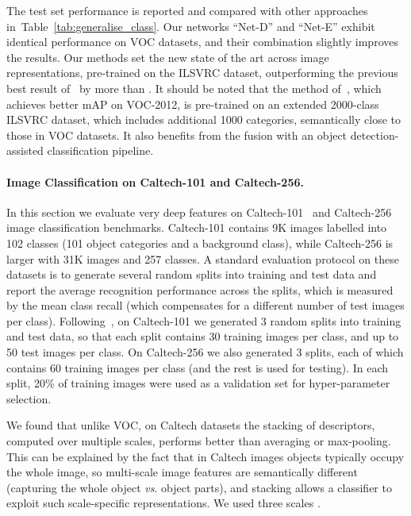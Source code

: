 \documentclass{article} \usepackage{iclr2015,times}
\makeatletter
\newcommand{\tblref}[1]{Table~\ref{#1}}
\newcommand*{\vs}{\emph{vs}.\@\xspace}
\makeatother
\begin{document}
The test set performance is reported and compared with other approaches in~\tblref{tab:generalise_class}. Our networks ``Net-D'' and ``Net-E'' exhibit identical performance on VOC datasets, and their combination slightly improves the results. Our methods set the new state of the art across image representations, pre-trained on the ILSVRC dataset, outperforming the previous best result of~\citet{Chatfield14} by more than . It should be noted that the method of~\citet{Wei14}, which achieves  better mAP on VOC-2012, is pre-trained on an extended 2000-class ILSVRC dataset, which includes additional 1000 categories, semantically close to those in VOC datasets. It also benefits from the fusion with an object detection-assisted classification pipeline.

\paragraph{Image Classification on Caltech-101 and Caltech-256.}
In this section we evaluate very deep features on \mbox{Caltech-101}~\citep{FeiFei04} and \mbox{Caltech-256}~\citep{Griffin07} image classification benchmarks. Caltech-101 contains 9K images labelled into 102 classes (101 object categories and a background class), while Caltech-256 is larger with 31K images and 257 classes. 
A standard evaluation protocol on these datasets is to generate several random splits into training and test data and report the average recognition performance across the splits, which is measured by the mean class recall (which compensates for a different number of test images per class).
Following~\citet{Chatfield14,Zeiler13,He14}, on Caltech-101 we generated 3 random splits into training and test data, so that each split contains 30 training images per class, and up to 50 test images per class. On Caltech-256 we also generated 3 splits, each of which contains 60 training images per class (and the rest is used for testing). In each split, 20\% of training images were used as a validation set for hyper-parameter selection.


We found that unlike VOC, on Caltech datasets the stacking of descriptors, computed over multiple scales, performs better than averaging or max-pooling. 
This can be explained by the fact that in Caltech images objects typically occupy the whole image, so multi-scale image features are semantically different (capturing the whole object \vs object parts), and stacking allows a classifier to exploit such scale-specific representations. We used three scales .
\end{document}

